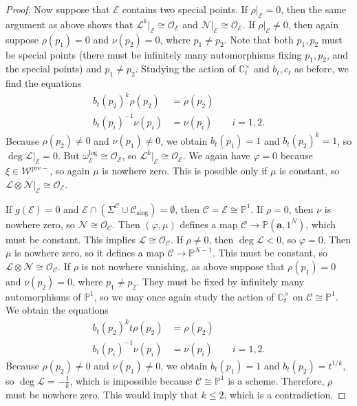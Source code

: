 \documentclass{amsart}
\theoremstyle{definition}
\theoremstyle{remark}
\theoremstyle{plain}
\theoremstyle{definition}
\theoremstyle{remark}
\newcommand{\C}{\mathbb{C}}
\renewcommand{\P}{\mathbb{P}}
\newcommand{\ba}{\mathbf{a}}
\newcommand{\mc}[1]{\mathcal{#1}}
\newcommand{\mr}[1]{\mathrm{#1}}
\newcommand{\1}{\mathbf{1}}
\newcommand{\2}{\mathbf{2}}
\newcommand{\3}{\mathbf{3}}
\begin{document}
\begin{proof}
  Now suppose that $\mc{E}$ contains two special points. If $\rho|_{\mc{E}} = 0$, then the same argument as above shows that $\mc{L}^k|_{\mc{E}} \cong \mc{O}_{\mc{E}}$ and $\mc{N}|_{\mc{E}} \cong \mc{O}_{\mc{E}}$. If $\rho|_{\mc{E}} \neq 0$, then again suppose $\rho(p_1) = 0$ and $\nu(p_2) = 0$, where $p_1 \neq p_2$. Note that both $p_1, p_2$ must be special points (there must be infinitely many automorphisms fixing $p_1, p_2$, and the special points) and $p_1 \neq p_2$. Studying the action of $\C^{\times}_t$ and $b_t, c_t$ as before, we find the equations
  \begin{align*}
    b_t(p_2)^k \rho(p_2) &= \rho(p_2) \\
    b_t(p_i)^{-1} \nu(p_i) &= \nu(p_i) \qquad i = 1,2.
  \end{align*}
  Because $\rho(p_2) \neq 0$ and $\nu(p_1) \neq 0$, we obtain $b_t(p_1) = 1$ and $b_t(p_2)^k = 1$, so $\deg \mc{L}|_{\mc{E}} = 0$. But $\omega_{\mc{E}}^{\log} \cong \mc{O}_{\mc{E}}$, so $\mc{L}^k |_{\mc{E}} \cong \mc{O}_{\mc{E}}$. We again have $\varphi = 0$ because $\xi \in \mc{W}^{\mr{pre}-}$, so again $\mu$ is nowhere zero. This is possible only if $\mu$ is constant, so $\mc{L} \otimes \mc{N}|_{\mc{E}} \cong \mc{O}_{\mc{E}}$.

    If $g(\mc{E}) = 0$ and $\mc{E} \cap (\Sigma^{\mc{C}} \cup \mc{C}_{\mr{sing}}) = \emptyset$, then $\mc{C} = \mc{E} \cong \P^1$. If $\rho = 0$, then $\nu$ is nowhere zero, so $\mc{N} \cong \mc{O}_{\mc{C}}$. Then $(\varphi,\mu)$ defines a map $\mc{C} \to \P(\ba,1^N)$, which must be constant. This implies $\mc{L} \cong \mc{O}_{\mc{C}}$. If $\rho \neq 0$, then $\deg \mc{L} < 0$, so $\varphi = 0$. Then $\mu$ is nowhere zero, so it defines a map $\mc{C} \to \P^{N-1}$. This must be constant, so $\mc{L} \otimes \mc{N} \cong \mc{O}_{\mc{C}}$. If $\rho$ is not nowhere vanishing, as above suppose that $\rho(p_1) = 0$ and $\nu(p_2) = 0$, where $p_1 \neq p_2$. They must be fixed by infinitely many automorphisms of $\P^1$, so we may once again study the action of $\C^{\times}_t$ on $\mc{C} \cong \P^1$. We obtain the equations
  \begin{align*}
    b_t(p_2)^k t \rho(p_2) &= \rho(p_2) \\
    b_t(p_i)^{-1} \nu(p_i) &= \nu(p_i) \qquad i = 1,2.
  \end{align*}
  Because $\rho(p_2) \neq 0$ and $\nu(p_1) \neq 0$, we obtain $b_t(p_1) = 1$ and $b_t(p_2) = t^{1/k}$, so $\deg \mc{L} = -\frac{1}{k}$, which is impossible because $\mc{C} \cong \P^1$ is a scheme. Therefore, $\rho$ must be nowhere zero. This would imply that $k \leq 2$, which is a contradiction.


\end{proof}
\end{document}
